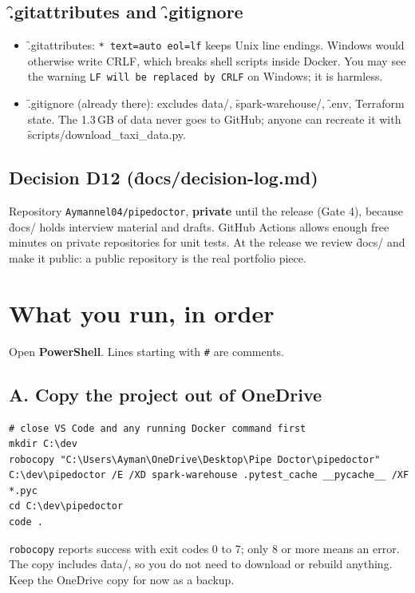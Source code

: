 \documentclass[11pt,a4paper]{article}
\let\oldsection\section
\renewcommand{\section}{\Needspace*{9\baselineskip}\oldsection}
\begin{document}
\subsection*{\f{.gitattributes} and \f{.gitignore}}
\begin{itemize}[leftmargin=14pt,itemsep=2pt]
\item \f{.gitattributes}: \texttt{* text=auto eol=lf} keeps Unix line endings. Windows would otherwise write CRLF, which breaks shell scripts inside Docker. You may see the warning \texttt{LF will be replaced by CRLF} on Windows; it is harmless.
\item \f{.gitignore} (already there): excludes \f{data/}, \f{spark-warehouse/}, \f{.env}, Terraform state. The 1.3\,GB of data never goes to GitHub; anyone can recreate it with \f{scripts/download_taxi_data.py}.
\end{itemize}

\subsection*{Decision D12 (\f{docs/decision-log.md})}
Repository \texttt{Aymannel04/pipedoctor}, \textbf{private} until the release (Gate 4), because \f{docs/} holds interview material and drafts. GitHub Actions allows enough free minutes on private repositories for unit tests. At the release we review \f{docs/} and make it public: a public repository is the real portfolio piece.

\section{What you run, in order}
Open \textbf{PowerShell}. Lines starting with \texttt{\#} are comments.

\subsection*{A. Copy the project out of OneDrive}
\begin{lstlisting}[style=cmd]
# close VS Code and any running Docker command first
mkdir C:\dev
robocopy "C:\Users\Ayman\OneDrive\Desktop\Pipe Doctor\pipedoctor" C:\dev\pipedoctor /E /XD spark-warehouse .pytest_cache __pycache__ /XF *.pyc
cd C:\dev\pipedoctor
code .
\end{lstlisting}
\texttt{robocopy} reports success with exit codes 0 to 7; only 8 or more means an error. The copy includes \f{data/}, so you do not need to download or rebuild anything. Keep the OneDrive copy for now as a backup.
\end{document}
